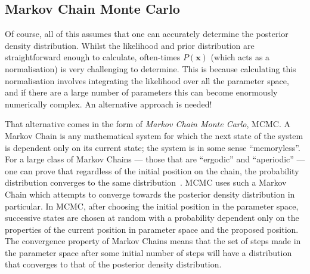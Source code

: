\subsection{Markov Chain Monte Carlo}
Of course, all of this assumes that one can accurately determine the posterior density distribution. Whilst the likelihood and prior distribution are straightforward enough to calculate, often-times $P\left(\bm{x}\right)$ (which acts as a normalisation) is very challenging to determine. This is because calculating this normalisation involves integrating the likelihood over all the parameter space, and if there are a large number of parameters this can become enormously numerically complex. An alternative approach is needed!

That alternative comes in the form of \textit{Markov Chain Monte Carlo}, MCMC. A Markov Chain is any mathematical system for which the next state of the system is dependent only on its current state; the system is in some sense ``memoryless''. For a large class of Markov Chains --- those that are ``ergodic'' and ``aperiodic'' --- one can prove that regardless of the initial position on the chain, the probability distribution converges to the same distribution~\cite{fellerIntroductionProbabilityTheory1968}. %
MCMC uses such a Markov Chain which attempts to converge towards the posterior density distribution in particular. In MCMC, after choosing the initial position in the parameter space, successive states are chosen at random with a probability dependent only on the properties of the current position in parameter space and the proposed position. The convergence property of Markov Chains means that the set of steps made in the parameter space after some initial number of steps will have a distribution that converges to that of the posterior density distribution.

